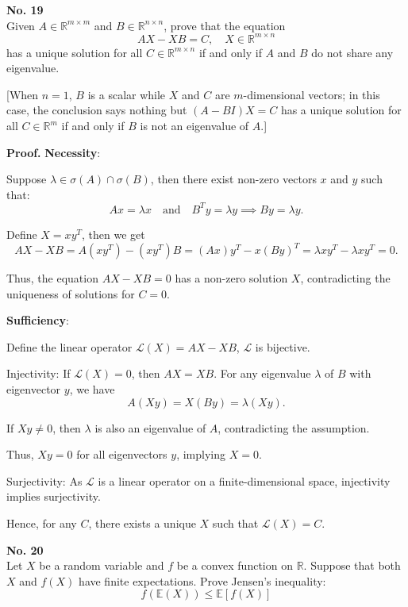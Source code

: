 \documentclass[a4paper, 11pt]{article}
\newenvironment{problem}[2][No.]
    { \begin{mdframed}[backgroundcolor=gray!5] \textbf{#1 #2} \\}
    {  \end{mdframed}}
\newenvironment{solution}
    {\textbf{Proof.}}
    {}
\begin{document}
\begin{problem}{19}
	Given \( A \in \mathbb{R}^{m \times m} \) and \( B \in \mathbb{R}^{n \times n} \), prove that the equation
	$$
	AX - XB = C, \quad X \in \mathbb{R}^{m \times n}
	$$
	has a unique solution for all \( C \in \mathbb{R}^{m \times n} \) if and only if \( A \) and \( B \) do not share any eigenvalue.
	
	[When \( n = 1 \), \( B \) is a scalar while \( X \) and \( C \) are \( m \)-dimensional vectors; in this case, the conclusion says nothing but \( (A - BI)X = C \) has a unique solution for all \( C \in \mathbb{R}^m \) if and only if \( B \) is not an eigenvalue of \( A \).]
\end{problem}

\begin{solution}
	\textbf{Necessity}: 
	
	Suppose \(\lambda \in \sigma(A) \cap \sigma(B)\), then there exist non-zero vectors \(x\) and \(y\) such that:
	$$
	Ax = \lambda x \quad \text{and} \quad B^T y = \lambda y \implies By = \lambda y.
	$$
	
	Define \(X = x y^T\), then we get
	$$
	AX - XB = A(xy^T) - (xy^T)B = (Ax)y^T - x(By)^T = \lambda xy^T - \lambda xy^T = 0.
	$$
	
	Thus, the equation \(AX - XB = 0\) has a non-zero solution \(X\), contradicting the uniqueness of solutions for \(C = 0\).
	
	\textbf{Sufficiency}: 
	
	Define the linear operator \(\mathcal{L}(X) = AX - XB\), \(\mathcal{L}\) is bijective.
	
	Injectivity: If \(\mathcal{L}(X) = 0\), then \(AX = XB\). For any eigenvalue \(\lambda\) of \(B\) with eigenvector \(y\), we have
	$$
	A(Xy) = X(By) = \lambda (Xy).
	$$
	
	If \(Xy \neq 0\), then \(\lambda\) is also an eigenvalue of \(A\), contradicting the assumption. 
	
	Thus, \(Xy = 0\) for all eigenvectors \(y\), implying \(X = 0\).
	
	Surjectivity: As \(\mathcal{L}\) is a linear operator on a finite-dimensional space, injectivity implies surjectivity. 
	
	Hence, for any \(C\), there exists a unique \(X\) such that \(\mathcal{L}(X) = C\).
\end{solution}

\begin{problem}{20}
	Let \( X \) be a random variable and \( f \) be a convex function on \( \mathbb{R} \). Suppose that both \( X \) and \( f(X) \) have finite expectations. Prove Jensen's inequality:
	$$
	f(\mathbb{E}(X)) \leq \mathbb{E}[f(X)]
	$$
\end{problem}
\end{document}
